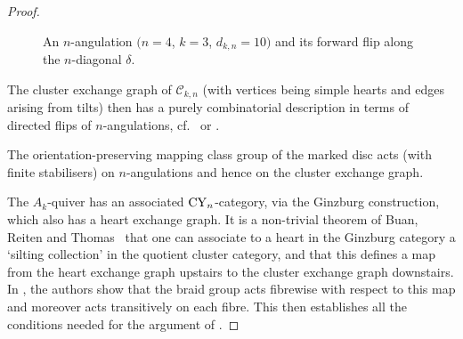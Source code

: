 \documentclass[pdftex]{sigma}
\theoremstyle{definition}
\numberwithin{equation}{section}
\begin{document}
\begin{proof}
\begin{figure}[ht]
\caption{An $n$-angulation $(n=4$, $k=3$, $d_{k,n}=10)$ and its forward flip along the $n$-diagonal $\delta$.}\label{fig:n-diagonal}
\end{figure}


 The cluster exchange graph of $\mathcal{C}_{k,n}$ (with vertices being simple hearts and edges arising from tilts) then has a purely combinatorial description in terms of directed flips of $n$-angulations, cf.~\cite[Theorem~5.6]{Baur-Marsh} or \cite[Theorem~6.3]{Ikeda}.

 The orientation-preserving mapping class group of the marked disc acts (with finite stabilisers) on $n$-angulations and hence on the cluster exchange graph.

 The $A_k$-quiver has an associated ${\rm CY}_n$-category, via the Ginzburg construction, which also has a heart exchange graph. It is a non-trivial theorem of Buan, Reiten and Thomas~\cite{BRT} that one can associate to a heart in the Ginzburg category a `silting collection' in the quotient cluster category, and that this defines a map from the heart exchange graph upstairs to the cluster exchange graph downstairs.
 In \cite[Theorem~8.6]{King-QiuYu-cluster}, the authors show that the braid group acts fibrewise with respect to this map and moreover acts transitively on each fibre. This then establishes all the conditions needed for the argument of \cite[Theorem~9.9]{BS}.
 \end{proof}
\end{document}
